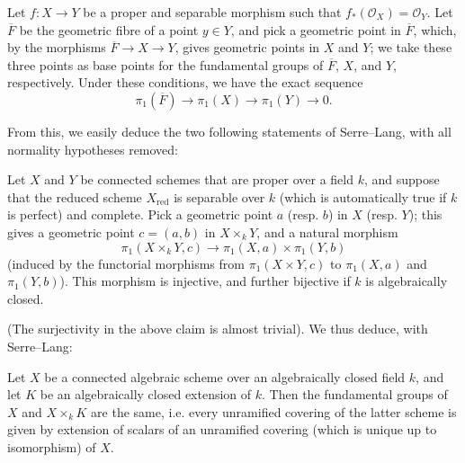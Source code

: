 \documentclass{article}
\theoremstyle{plain}
\newenvironment{corollary}[1]
  {\renewcommand\theinnercustomcorollary{#1}\innercustomcorollary}
  {\endinnercustomcorollary}
\theoremstyle{definition}
\newcommand{\sh}{\mathscr}
\newcommand{\red}{\mathrm{red}}
\begin{document}
\begin{corollary}{4}
\label{theorem11corollary4}
  Let $f\colon X\to Y$ be a proper and separable morphism such that $f_*(\sh{O}_X)=\sh{O}_Y$.
  Let $\overline{F}$ be the geometric fibre of a point $y\in Y$, and pick a geometric point in $\overline{F}$, which, by the morphisms $\overline{F}\to X\to Y$, gives geometric points in $X$ and $Y$; we take these three points as base points for the fundamental groups of $\overline{F}$, $X$, and $Y$, respectively.
  Under these conditions, we have the exact sequence
  \[
    \boxed{\pi_1(\overline{F}) \to \pi_1(X) \to \pi_1(Y) \to 0.}
  \]
\end{corollary}

From this, we easily deduce the two following statements of Serre--Lang, with all normality hypotheses removed:

\begin{corollary}{5}
\label{theorem11corollary5}
  Let $X$ and $Y$ be connected schemes that are proper over a field $k$, and suppose that the reduced scheme $X_\red$ is separable over $k$ (which is automatically true if $k$ is perfect) and complete.
  Pick a geometric point $a$ (resp. $b$) in $X$ (resp. $Y$); this gives a geometric point $c=(a,b)$ in $X\times_kY$, and a natural morphism
  \[
    \pi_1(X\times_kY,c) \to \pi_1(X,a)\times\pi_1(Y,b)
  \]
  (induced by the functorial morphisms from $\pi_1(X\times Y,c)$ to $\pi_1(X,a)$ and $\pi_1(Y,b)$).
  This morphism is injective, and further bijective if $k$ is algebraically closed.
\end{corollary}

(The surjectivity in the above claim is almost trivial).
We thus deduce, with Serre--Lang:

\begin{corollary}{6}
\label{theorem11corollary6}
  Let $X$ be a connected algebraic scheme over an algebraically closed field $k$, and let $K$ be an algebraically closed extension of $k$.
  Then the fundamental groups of $X$ and $X\times_kK$ are the same, i.e. every unramified covering of the latter scheme is given by extension of scalars of an unramified covering (which is unique up to isomorphism) of $X$.
\end{corollary}
\end{document}
